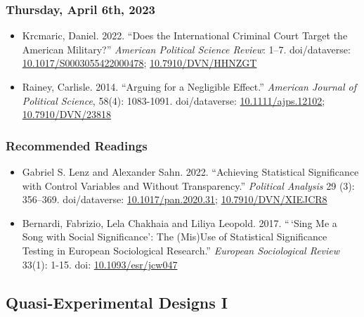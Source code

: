 \documentclass[12pt,]{article}
\begin{document}
\hypertarget{thursday-april-6th-2023}{%
\subsubsection{Thursday, April 6th,
2023}\label{thursday-april-6th-2023}}

\begin{itemize}
\item
  Krcmaric, Daniel. 2022. ``Does the International Criminal Court Target
  the American Military?'' \emph{American Political Science Review}:
  1--7. doi/dataverse:
  \href{https://doi.org/10.1017/S0003055422000478}{10.1017/S0003055422000478};
  \href{https://doi.org/10.7910/DVN/HHNZGT}{10.7910/DVN/HHNZGT}
\item
  Rainey, Carlisle. 2014. ``Arguing for a Negligible Effect.''
  \emph{American Journal of Political Science}, 58(4): 1083-1091.
  doi/dataverse:
  \href{https://doi.org/10.1111/ajps.12102}{10.1111/ajps.12102};
  \href{https://doi.org/10.7910/DVN/23818}{10.7910/DVN/23818}
\end{itemize}

\hypertarget{recommended-readings-8}{%
\subsubsection{Recommended Readings}\label{recommended-readings-8}}

\begin{itemize}
\item
  Gabriel S. Lenz and Alexander Sahn. 2022. ``Achieving Statistical
  Significance with Control Variables and Without Transparency.''
  \emph{Political Analysis} 29 (3): 356--369. doi/dataverse:
  \href{https://doi.org/10.1017/pan.2020.31}{10.1017/pan.2020.31};
  \href{https://doi.org/10.7910/DVN/XIEJCR8}{10.7910/DVN/XIEJCR8}
\item
  Bernardi, Fabrizio, Lela Chakhaia and Liliya Leopold. 2017. ``\,`Sing
  Me a Song with Social Significance': The (Mis)Use of Statistical
  Significance Testing in European Sociological Research.''
  \emph{European Sociological Review} 33(1): 1-15. doi:
  \href{https://doi.org/10.1093/esr/jcw047}{10.1093/esr/jcw047}
\end{itemize}

\hypertarget{quasi-experimental-designs-i}{%
\subsection{Quasi-Experimental Designs
I}\label{quasi-experimental-designs-i}}
\end{document}
